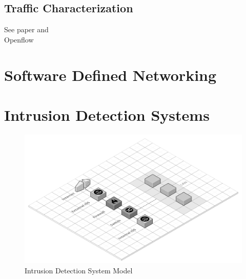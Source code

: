 \subsection{Traffic Characterization}
\label{subsec:traffic-characterization}

See paper \cite{Iglesias2015} and  \cite{Velan2016} \\ Openflow \\
\lipsum


\section{Software Defined Networking}
\label{sec:sdn}

\lipsum


\section{Intrusion Detection Systems}
\label{sec:intrusion-detection-system}

\lipsum[1-5]

    \begin{figure}[h!]
        \centering
        \includegraphics[scale=0.23]{figures/Intrusion Detection System Model.png}
        \caption{Intrusion Detection System Model}
        \label{fig:IDS-model}
    \end{figure}


